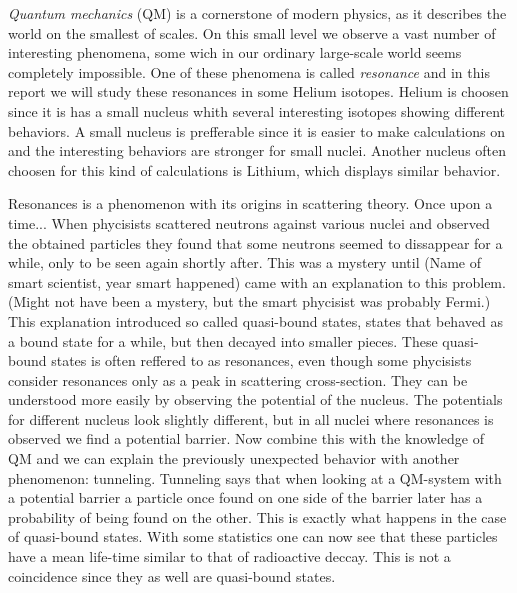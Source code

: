 \emph{Quantum mechanics} (QM) is a cornerstone of modern physics, as it describes the world on the smallest of scales.
On this small level we observe a vast number of interesting phenomena, some wich in our ordinary large-scale world seems completely impossible.
One of these phenomena is called \emph{resonance} and in this report we will study these resonances in some Helium isotopes.
Helium is choosen since it is has a small nucleus whith several interesting isotopes showing different behaviors.
A small nucleus is prefferable since it is easier to make calculations on and the interesting behaviors are stronger for small nuclei.
Another nucleus often choosen for this kind of calculations is Lithium, which displays similar behavior.

Resonances is a phenomenon with its origins in scattering theory.
Once upon a time... When phycisists scattered neutrons against various nuclei and observed the obtained particles they found that some neutrons seemed to dissappear for a while, only to be seen again shortly after.
This was a mystery until (Name of smart scientist, year smart happened) came with an explanation to this problem. (Might not have been a mystery, but the smart phycisist was probably Fermi.)
This explanation introduced so called quasi-bound states, states that behaved as a bound state for a while, but then decayed into smaller pieces.
These quasi-bound states is often reffered to as resonances, even though some phycisists consider resonances only as a peak in scattering cross-section.
They can be understood more easily by observing the potential of the nucleus.
The potentials for different nucleus look slightly different, but in all nuclei where resonances is observed we find a potential barrier.
Now combine this with the knowledge of QM and we can explain the previously unexpected behavior with another phenomenon: tunneling.
Tunneling says that when looking at a QM-system with a potential barrier a particle once found on one side of the barrier later has a probability of being found on the other.
This is exactly what happens in the case of quasi-bound states.
With some statistics one can now see that these particles have a mean life-time similar to that of radioactive deccay.
This is not a coincidence since they as well are quasi-bound states.


